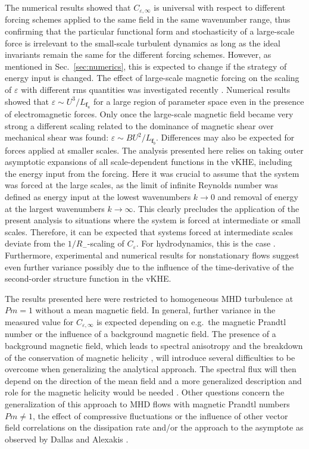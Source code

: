 \documentclass[aps,pre,onecolumn,superscriptaddress,notitlepage]{revtex4-1}
\newcommand{\Ceps}{C_\varepsilon}
\newcommand{\Cinf}{C_{\varepsilon,\infty}}
\newcommand{\vep}{\varepsilon}
\renewcommand{\vec}[1]{\bm{#1}}
\begin{document}
The numerical results showed that $\Cinf$ is universal with respect to different 
forcing schemes applied to the same field in the 
same wavenumber range, thus confirming that the particular 
functional form and stochasticity of a large-scale force is 
irrelevant to the small-scale turbulent dynamics as long as the ideal invariants remain the same 
for the different forcing schemes. However, as mentioned in Sec.~\ref{sec:numerics}, this is 
expected to change if the strategy of energy input is changed. The effect of large-scale 
magnetic forcing on the scaling of $\vep$ with different rms 
quantities was investigated recently \cite{Alexakis13}. Numerical results showed 
that $\vep \sim U^3/L_{\vec{f}_u}$ for a large region of parameter space even in the presence of 
electromagnetic forces. Only once the large-scale magnetic field became very strong
a different scaling related to the dominance of magnetic shear over mechanical shear was found:
$\vep \sim BU^2/L_{\vec{f}_b}$.   
%
Differences may also be expected for forces applied at smaller scales.
      The analysis presented here relies on taking outer asymptotic expansions
      of all scale-dependent functions in the vKHE, including 
      the energy input from the forcing. Here it was crucial to assume that the system 
      was forced at the large scales, as the limit of infinite Reynolds number was defined
      as energy input at the lowest wavenumbers $k \to 0$ and removal of energy at the largest 
      wavenumbers $k \to \infty$. This clearly precludes the application of the present analysis
      to situations where the system is forced at intermediate or small scales. 
      Therefore, it can be expected that systems forced at intermediate scales deviate 
      from the $1/R_{-}$-scaling of $\Ceps$. 
For hydrodynamics, this is the case \cite{Doering09,Biferale04,Mazzi04}. 
Furthermore, experimental and numerical results for nonstationary flows 
\cite{Valente14,Vassilicos15} 
suggest even further variance possibly due to the influence of the 
time-derivative of the second-order structure function in the vKHE. 
 
The results presented here were restricted to homogeneous 
MHD turbulence at $Pm =1$ without a mean magnetic field. 
In general, further variance in the measured value for $\Cinf$ is expected depending 
on e.g.~the magnetic Prandtl number \cite{Brandenburg14b} or the 
influence of a background magnetic field.
The presence of a background magnetic field, which leads to spectral anisotropy and the 
breakdown of the conservation of magnetic helicity \cite{Matthaeus82a}, will
introduce several difficulties to be overcome when generalizing the analytical approach.
The spectral flux will then depend on the direction of the mean
field \cite{Wan09,Wan12} and a more generalized description
and role for the magnetic helicity would be needed \cite{Berger97,Berger99}. 
Other questions concern the generalization of this approach to 
MHD flows with magnetic Prandtl numbers $Pm \neq 1$, the effect of compressive fluctuations 
or the influence of other vector field correlations on the dissipation rate and/or 
the approach to the asymptote as observed by Dallas and Alexakis \cite{Dallas13a}. 
\end{document}
